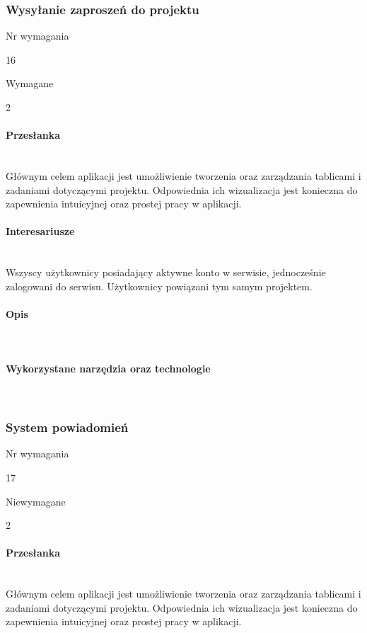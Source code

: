 \documentclass[eng,printmode]{mgr}
\begin{document}
\subsubsection{Wysyłanie zaproszeń do projektu}
\begin{labeling}{Nr wymagania}
\item [Nr wymagania:] 16
\item [Typ:] Wymagane
\item [Powiązania:] 2
\end{labeling}

\paragraph{Przesłanka}\ \\
Głównym celem aplikacji jest umożliwienie tworzenia oraz zarządzania tablicami i zadaniami dotyczącymi projektu. Odpowiednia ich wizualizacja jest konieczna do zapewnienia intuicyjnej oraz prostej pracy w aplikacji.

\paragraph{Interesariusze}\ \\
Wszyscy użytkownicy posiadający aktywne konto w serwisie, jednocześnie zalogowani do serwisu. Użytkownicy powiązani tym samym projektem.

\paragraph{Opis}\ \\

\paragraph{Wykorzystane narzędzia oraz technologie}\ \\
\newpage

\subsubsection{System powiadomień}
\begin{labeling}{Nr wymagania}
\item [Nr wymagania:] 17
\item [Typ:] Niewymagane
\item [Powiązania:] 2
\end{labeling}

\paragraph{Przesłanka}\ \\
Głównym celem aplikacji jest umożliwienie tworzenia oraz zarządzania tablicami i zadaniami dotyczącymi projektu. Odpowiednia ich wizualizacja jest konieczna do zapewnienia intuicyjnej oraz prostej pracy w aplikacji.
\end{document}
